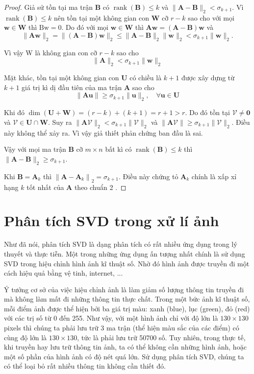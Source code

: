 \documentclass[12pt,a4paper,oneside]{report}
\numberwithin{equation}{section}
\begin{document}
\begin{proof}
Giả sử tồn tại ma trận $\mathbf{B}$ có $\operatorname{rank}(\mathbf{B}) \leqslant k$ và $\|\mathbf{A}-\mathbf{B}\|_{2}<\sigma_{k+1}$. Vì $\operatorname{rank}(\mathbf{B}) \leqslant k$ nên tồn tại một không gian con $\mathbf{W}$ cỡ $r-k$ sao cho với mọi $\mathbf{w} \in \mathbf{W}$ thì $\mathrm{Bw}=0$.
Do đó với mọi $\mathbf{w} \in \mathbf{W}$ thì $\mathbf{A} \mathbf{w}=(\mathbf{A}-\mathbf{B}) \mathbf{w}$ và
$$
\|\mathbf{A} \mathbf{w}\|_{2}=\|(\mathbf{A}-\mathbf{B}) \mathbf{w}\|_{2} \leqslant\|\mathbf{A}-\mathbf{B}\|_{2}\|\mathbf{w}\|_{2}<\sigma_{k+1}\|\mathbf{w}\|_{2} .
$$

Vì vậy W là không gian con cỡ $r-k$ sao cho
$$
\|\mathbf{A}\|_{2}<\sigma_{k+1}\|\mathbf{w}\|_{2}
$$

Mặt khác, tồn tại một không gian con $\mathbf{U}$ có chiều là $k+1$ được xây dựng từ $k+1$ giá trị kì dị đầu tiên của ma trận $\mathbf{A}$ sao cho
$$
\|\mathbf{A} \mathbf{u}\| \geqslant \sigma_{k+1}\|\mathbf{u}\|_{2}, \quad \forall \mathbf{u} \in \mathbf{U}
$$

Khi đó $\operatorname{dim}(\mathbf{U}+\mathbf{W})=(r-k)+(k+1)=r+1>r$. Do đó tồn tại $\mathcal{V} \neq \mathbf{0}$ và $\mathcal{V} \in \mathbf{U} \cap \mathbf{W}$. Suy ra $\|\mathbf{A} \mathcal{V}\|_{2}<\sigma_{k+1}\|\mathcal{V}\|_{2}$ và $\|\mathbf{A} \mathcal{V}\| \geqslant \sigma_{k+1}\|\mathcal{V}\|_{2}$. Điều này không thể xảy ra. Vì vậy giả thiết phản chứng ban đầu là sai.

Vậy với mọi ma trận $\mathbf{B}$ cỡ $m \times n$ bất kì có $\operatorname{rank}(\mathbf{B}) \leqslant k$ thì $\|\mathbf{A}-\mathbf{B}\|_{2} \geqslant \sigma_{k+1}$.

Khi $\mathbf{B}=\mathbf{A}_{k}$ thì $\left\|\mathbf{A}-\mathbf{A}_{k}\right\|_{2}=\sigma_{k+1}$. Điều này chứng tỏ $\mathbf{A}_{k}$ chính là xấp xỉ hạng $k$ tốt nhất của $\mathbf{A}$ theo chuẩn 2 . 
\end{proof}

\section{Phân tích SVD trong xử lí ảnh}

Như đã nói, phân tích SVD là dạng phân tích có rất nhiều ứng dụng trong lý thuyết và thực tiễn. Một trong những ứng dụng ấn tượng nhất chính là sử dụng SVD trong hiệu chỉnh hình ảnh kĩ thuật số. Nhờ đó hình ảnh được truyền đi một cách hiệu quả bằng vệ tinh, internet, ...

Ý tưởng cơ sở của việc hiệu chỉnh ảnh là làm giảm số lượng thông tin truyền đi mà không làm mất đi những thông tin thực chất. Trong một bức ảnh kĩ thuật số, mỗi điểm ảnh được thể hiện bởi ba giá trị màu: xanh (blue), lục (green), đỏ (red) với các trị số từ 0 đến 255. Như vậy, với một hình ảnh chỉ với độ lớn là $130 \times 130$ pixels thì chúng ta phải lưu trữ 3 ma trận (thể hiện màu sắc của các điểm) có cùng độ lớn là $130 \times 130$, tức là phải lưu trữ 50700 số. Tuy nhiên, trong thực tế, khi truyền hay lưu trữ thông tin ảnh, ta có thể không cần những hình ảnh, hoặc một số phần của hình ảnh có độ nét quá lớn. Sử dụng phân tích SVD, chúng ta có thể loại bỏ rất nhiều thông tin không cần thiết đó.
\end{document}
